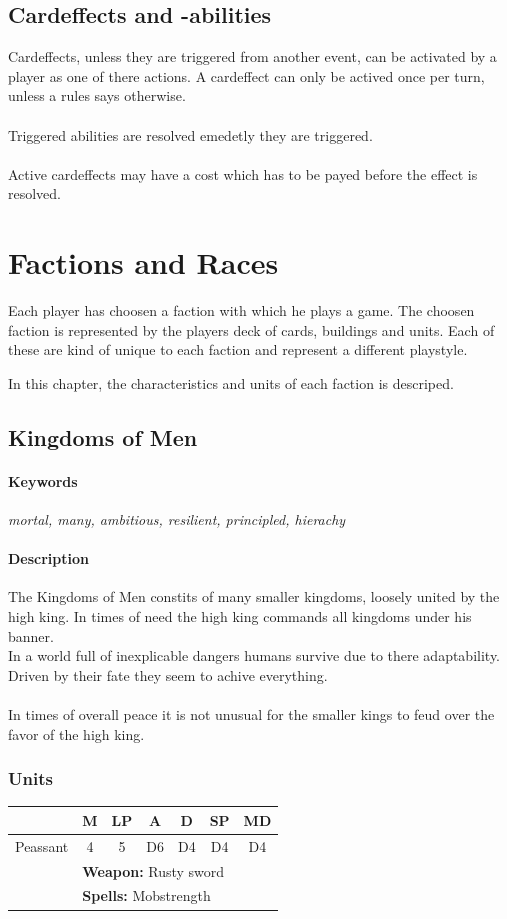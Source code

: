 \documentclass[a5paper,pagesize,10pt,bibtotoc,pointlessnumbers,
normalheadings,DIV=9,twoside=false]{scrbook}
\begin{document}
\section{Cardeffects and -abilities}
Cardeffects, unless they are triggered from another event, can be activated by a player as one of there actions. A cardeffect can only be actived once per turn, unless a rules says otherwise.\\
\\
Triggered abilities are resolved emedetly they are triggered.\\
\\
Active cardeffects may have a cost which has to be payed before the effect is resolved.

\chapter{Factions and Races}
Each player has choosen a faction with which he plays a game. The choosen faction is represented by the players deck of cards, buildings and units. Each of these are kind of unique to each faction and represent a different playstyle.

In this chapter, the characteristics and units of each faction is descriped.

\section{Kingdoms of Men}
\subsubsection{Keywords}
\emph{mortal, many, ambitious, resilient, principled, hierachy}

\subsubsection{Description}
The Kingdoms of Men constits of many smaller kingdoms, loosely united by the high king. In times of need the high king commands all kingdoms under his banner.\\
In a world full of inexplicable dangers humans survive due to there adaptability. Driven by their fate they seem to achive everything.\\
\\
In times of overall peace it is not unusual for the smaller kings to feud over the favor of the high king.

\subsection{Units}
 \begin{tabular}{||c c c c c c c||} 
 \hline
  & M & LP & A & D & SP & MD \\
 \hline\hline
 Peassant & 4 & 5 & D6 & D4 & D4 & D4 \\ 
  & \multicolumn{6}{l||}{\textbf{Weapon:} Rusty sword} \\
  & \multicolumn{6}{l||}{\textbf{Spells:} Mobstrength} \\
 \hline

\end{tabular}
\end{document}
